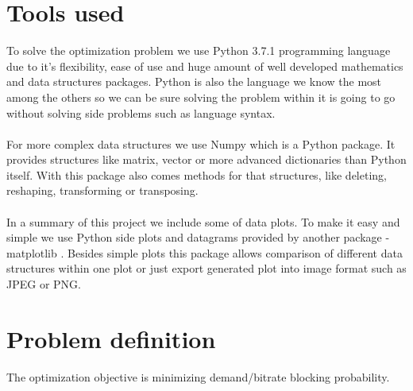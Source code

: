 \documentclass[conference]{IEEEtran}
\begin{document}
\section{Tools used}
To solve the optimization problem we use Python 3.7.1 \cite{python} programming language due to it's flexibility, ease of use and huge amount of well developed mathematics and data structures packages. Python is also the language we know the most among the others so we can be sure solving the problem within it is going to go without solving side problems such as language syntax.
\\ \\
For more complex data structures we use Numpy \cite{numpy} which is a Python package. It provides structures like matrix, vector or more advanced dictionaries than Python itself. With this package also comes methods for that structures, like deleting, reshaping, transforming or transposing.
\\ \\
In a summary of this project we include some of data plots. To make it easy and simple we use Python side plots and datagrams provided by another package - matplotlib \cite{matplotlib}. Besides simple plots this package allows comparison of different data structures within one plot or just export generated plot into image format such as JPEG or PNG.
\\

\section{Problem definition}
The optimization objective is minimizing demand/bitrate blocking probability. 
\\
\end{document}
